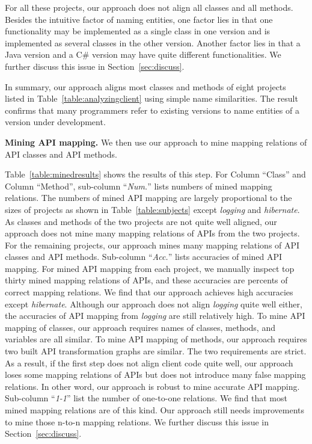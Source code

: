 For all these projects, our approach does not align all classes and
all methods. Besides the intuitive factor of naming entities, one
factor lies in that one functionality may be implemented as a single
class in one version and is implemented as several classes in the
other version. Another factor lies in that a Java version and a C\#
version may have quite different functionalities. We further discuss
this issue in Section~\ref{sec:discuss}.

In summary, our approach aligns most classes and methods of eight
projects listed in Table~\ref{table:analyzingclient} using simple
name similarities. The result confirms that many programmers refer
to existing versions to name entities of a version under
development.



\textbf{Mining API mapping.} We then use our approach to mine
mapping relations of API classes and API methods.

Table~\ref{table:minedresults} shows the results of this step. For
Column ``Class'' and Column ``Method'', sub-column ``\emph{Num.}''
lists numbers of mined mapping relations. The numbers of mined API
mapping are largely proportional to the sizes of projects as shown
in Table~\ref{table:subjects} except \emph{logging} and
\emph{hibernate}. As classes and methods of the two projects are not
quite well aligned, our approach does not mine many mapping
relations of APIs from the two projects. For the remaining projects,
our approach mines many mapping relations of API classes and API
methods. Sub-column ``\emph{Acc.}'' lists accuracies of mined API
mapping. For mined API mapping from each project, we manually
inspect top thirty mined mapping relations of APIs, and these
accuracies are percents of correct mapping relations. We find that
our approach achieves high accuracies except \emph{hibernate}.
Although our approach does not align \emph{logging} quite well
either, the accuracies of API mapping from \emph{logging} are still
relatively high. To mine API mapping of classes, our approach
requires names of classes, methods, and variables are all similar.
To mine API mapping of methods, our approach requires two built API
transformation graphs are similar. The two requirements are strict.
As a result, if the first step does not align client code quite
well, our approach loses some mapping relations of APIs but does not
introduce many false mapping relations. In other word, our approach
is robust to mine accurate API mapping. Sub-column ``\emph{1-1}''
list the number of one-to-one relations. We find that most mined
mapping relations are of this kind. Our approach still needs
improvements to mine those n-to-n mapping relations. We further
discuss this issue in Section~\ref{sec:discuss}.


